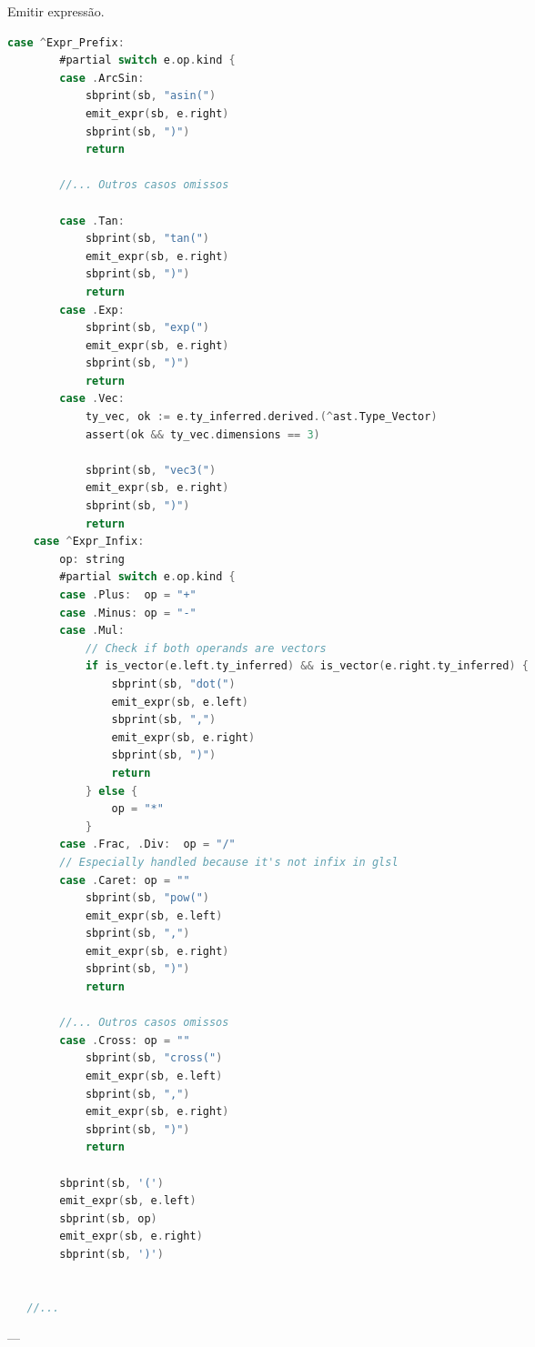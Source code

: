 \begin{codigo}[htb]
   \caption{\small Emitir expressão. }
   \label{cod-emit-expr}
\begin{lstlisting}[language=C, frame=none, inputencoding=utf8]
    case ^Expr_Prefix:
        #partial switch e.op.kind {
        case .ArcSin:
            sbprint(sb, "asin(")
            emit_expr(sb, e.right)
            sbprint(sb, ")")
            return

        //... Outros casos omissos

        case .Tan:
            sbprint(sb, "tan(")
            emit_expr(sb, e.right)
            sbprint(sb, ")")
            return
        case .Exp:
            sbprint(sb, "exp(")
            emit_expr(sb, e.right)
            sbprint(sb, ")")
            return
        case .Vec:
            ty_vec, ok := e.ty_inferred.derived.(^ast.Type_Vector)
            assert(ok && ty_vec.dimensions == 3)

            sbprint(sb, "vec3(")
            emit_expr(sb, e.right)
            sbprint(sb, ")")
            return
    case ^Expr_Infix:
        op: string
        #partial switch e.op.kind {
        case .Plus:  op = "+"
        case .Minus: op = "-"
        case .Mul:
            // Check if both operands are vectors
            if is_vector(e.left.ty_inferred) && is_vector(e.right.ty_inferred) {
                sbprint(sb, "dot(")
                emit_expr(sb, e.left)
                sbprint(sb, ",")
                emit_expr(sb, e.right)
                sbprint(sb, ")")
                return
            } else {
                op = "*"
            }
        case .Frac, .Div:  op = "/"
        // Especially handled because it's not infix in glsl
        case .Caret: op = ""
            sbprint(sb, "pow(")
            emit_expr(sb, e.left)
            sbprint(sb, ",")
            emit_expr(sb, e.right)
            sbprint(sb, ")")
            return

        //... Outros casos omissos
        case .Cross: op = ""
            sbprint(sb, "cross(")
            emit_expr(sb, e.left)
            sbprint(sb, ",")
            emit_expr(sb, e.right)
            sbprint(sb, ")")
            return

        sbprint(sb, '(')
        emit_expr(sb, e.left)
        sbprint(sb, op)
        emit_expr(sb, e.right)
        sbprint(sb, ')')


   //... 

\end{lstlisting}
\end{codigo}
---
